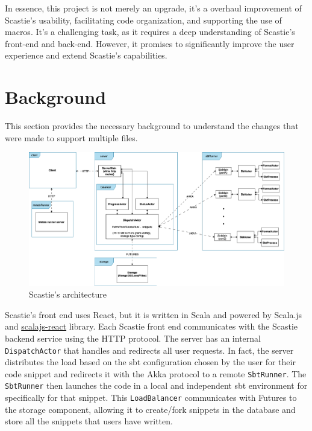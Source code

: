 \documentclass[a4paper,11pt,oneside]{report}
\begin{document}
In essence, this project is not merely an upgrade, it's a overhaul improvement of Scastie's usability, facilitating code organization, and supporting the use of macros. It's a challenging task, as it requires a deep understanding of Scastie's front-end and back-end. However, it promises to significantly improve the user experience and extend Scastie's capabilities.

\chapter{Background}

This section provides the necessary background to understand the changes that were made to support multiple files.

\begin{figure}[h]
\centering
\includegraphics[width=16.5cm]{ScastieArchitecture.png}
\caption{Scastie's architecture}
\end{figure}

Scastie's front end uses React, but it is written in Scala and powered by Scala.js and \href{https://github.com/japgolly/scalajs-react}{\color{blue}scalajs-react} library. Each Scastie front end communicates with the Scastie backend service using the HTTP protocol.
The server has an internal \lstinline{DispatchActor} that handles and redirects all user requests. In fact, the server distributes the load based on the sbt configuration chosen by the user for their code snippet and redirects it with the Akka protocol to a remote \lstinline{SbtRunner}. The \lstinline{SbtRunner} then launches the code in a local and independent sbt environment for specifically for that snippet.
This \lstinline{LoadBalancer} communicates with Futures to the storage component, allowing it to create/fork snippets in the database and store all the snippets that users have written.
\end{document}

